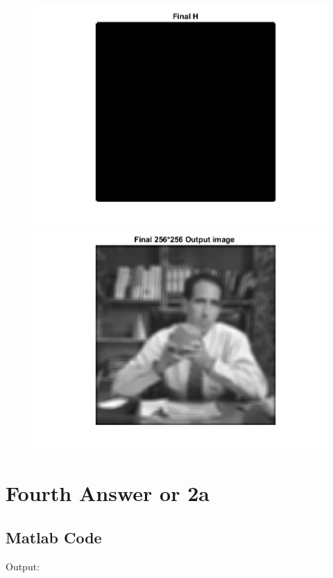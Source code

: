 \documentclass[11pt]{article} %
\begin{document}
\begin{figure}
 \centering
	\includegraphics{1ce.png}
	\includegraphics{1cf.png}
\end{figure}
\clearpage

\section {Fourth Answer or 2a}
\subsection*{Matlab Code}


Output:
\end{document}
